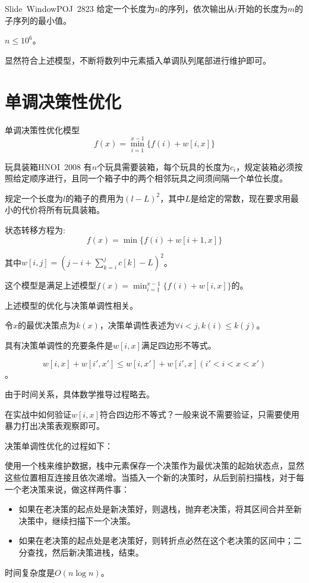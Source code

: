 \documentclass[9pt,dvipsnames,table,UTF8,aspectratio=169]{beamer}
\begin{document}
\begin{frame}{Slide\ Window}{POJ\ 2823}
	给定一个长度为$n$的序列，依次输出从$i$开始的长度为$m$的子序列的最小值。

	$n \le 10^6$。

	\pause
	显然符合上述模型，不断将数列中元素插入单调队列尾部进行维护即可。
\end{frame}

\section{单调决策性优化}
\begin{frame}{单调决策性优化模型}
	$$f(x) = \min_{i = 1}^{x - 1} \{f(i) + w[i, x]\}$$
\end{frame}

\begin{frame}{玩具装箱}{HNOI\ 2008}
	有$n$个玩具需要装箱，每个玩具的长度为$c_i$，规定装箱必须按照给定顺序进行，且同一个箱子中的两个相邻玩具之间须间隔一个单位长度。

	规定一个长度为$l$的箱子的费用为$(l - L)^2$，其中$L$是给定的常数，现在要求用最小的代价将所有玩具装箱。
\end{frame}

\begin{frame}
	状态转移方程为:$$f(x) = \min{\{f(i) + w[i + 1, x]\}}$$

	其中$w[i, j] = (j - i + \sum_{k = i}^{j}{c[k]} - L)^2$。
	
	这个模型是满足上述模型$f(x) = \min_{i = 1}^{x - 1} \{f(i) + w[i, x]\}$的。
\end{frame}

\begin{frame}
	上述模型的优化与决策单调性相关。

	令$x$的最优决策点为$k(x)$，决策单调性表述为$\forall i < j, k(i) \le k(j)$。

	具有决策单调性的充要条件是$w[i, x]$满足四边形不等式。

	$$w[i, x] + w[i', x'] \le w[i, x'] + w[i', x](i' < i < x < x')$$。

	由于时间关系，具体数学推导过程略去。

	\pause
	在实战中如何验证$w[i, x]$符合四边形不等式？一般来说不需要验证，只需要使用暴力打出决策表观察即可。
\end{frame}

\begin{frame}
	决策单调性优化的过程如下：

	使用一个栈来维护数据，栈中元素保存一个决策作为最优决策的起始状态点，显然这些位置相互连接且依次递增。当插入一个新的决策时，从后到前扫描栈，对于每一个老决策来说，做这样两件事：

	\begin{itemize}
		\item 如果在老决策的起点处是新决策好，则退栈，抛弃老决策，将其区间合并至新决策中，继续扫描下一个决策。
		\item 如果在老决策的起点处是老决策好，则转折点必然在这个老决策的区间中；二分查找，然后新决策进栈，结束。
	\end{itemize}
	
	时间复杂度是$O(n\log{n})$。
\end{frame}	
\end{document}
